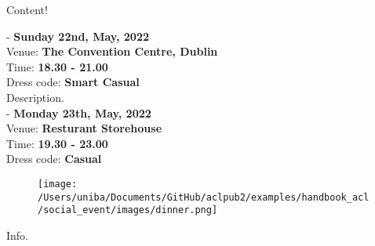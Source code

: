 Content! \\\leavevmode\newline

 -
 {\normalsize \textbf{Sunday 22nd, May, 2022}\\
 Venue: \textbf{The Convention Centre, Dublin}\\
 Time: \textbf{18.30 - 21.00}\\
 Dress code: \textbf{Smart Casual} }\\

Description.\\

 -
 {\normalsize \textbf{Monday 23th, May, 2022}\\
 Venue: \textbf{Resturant Storehouse}\\
 Time: \textbf{19.30 - 23.00}\\
 Dress code: \textbf{Casual}} \\

\begin{figure}[h!]
  \centering
      \texttt{[image: /Users/uniba/Documents/GitHub/aclpub2/examples/handbook\_acl/social\_event/images/dinner.png]}
\end{figure}

Info.